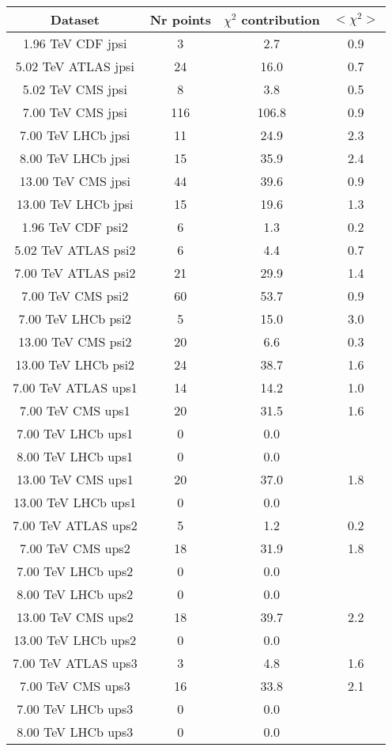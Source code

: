 \begin{table}[h!]
\centering
\begin{tabular}{c|c|c|c}
Dataset & Nr points & $\chi^2$ contribution & $<\chi^2>$ \\
\hline
1.96 TeV CDF jpsi & 3 & 2.7 & 0.9 \\
5.02 TeV ATLAS jpsi & 24 & 16.0 & 0.7 \\
5.02 TeV CMS jpsi & 8 & 3.8 & 0.5 \\
7.00 TeV CMS jpsi & 116 & 106.8 & 0.9 \\
7.00 TeV LHCb jpsi & 11 & 24.9 & 2.3 \\
8.00 TeV LHCb jpsi & 15 & 35.9 & 2.4 \\
13.00 TeV CMS jpsi & 44 & 39.6 & 0.9 \\
13.00 TeV LHCb jpsi & 15 & 19.6 & 1.3 \\
1.96 TeV CDF psi2 & 6 & 1.3 & 0.2 \\
5.02 TeV ATLAS psi2 & 6 & 4.4 & 0.7 \\
7.00 TeV ATLAS psi2 & 21 & 29.9 & 1.4 \\
7.00 TeV CMS psi2 & 60 & 53.7 & 0.9 \\
7.00 TeV LHCb psi2 & 5 & 15.0 & 3.0 \\
13.00 TeV CMS psi2 & 20 & 6.6 & 0.3 \\
13.00 TeV LHCb psi2 & 24 & 38.7 & 1.6 \\
7.00 TeV ATLAS ups1 & 14 & 14.2 & 1.0 \\
7.00 TeV CMS ups1 & 20 & 31.5 & 1.6 \\
7.00 TeV LHCb ups1 & 0 & 0.0 &  \\
8.00 TeV LHCb ups1 & 0 & 0.0 &  \\
13.00 TeV CMS ups1 & 20 & 37.0 & 1.8 \\
13.00 TeV LHCb ups1 & 0 & 0.0 &  \\
7.00 TeV ATLAS ups2 & 5 & 1.2 & 0.2 \\
7.00 TeV CMS ups2 & 18 & 31.9 & 1.8 \\
7.00 TeV LHCb ups2 & 0 & 0.0 &  \\
8.00 TeV LHCb ups2 & 0 & 0.0 &  \\
13.00 TeV CMS ups2 & 18 & 39.7 & 2.2 \\
13.00 TeV LHCb ups2 & 0 & 0.0 &  \\
7.00 TeV ATLAS ups3 & 3 & 4.8 & 1.6 \\
7.00 TeV CMS ups3 & 16 & 33.8 & 2.1 \\
7.00 TeV LHCb ups3 & 0 & 0.0 &  \\
8.00 TeV LHCb ups3 & 0 & 0.0 &  \\

\end{tabular}
\end{table}
